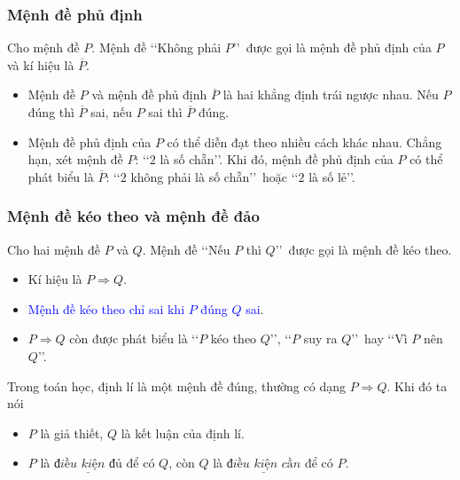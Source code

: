 \begin{tomtat}
\subsubsection{Mệnh đề phủ định}

\begin{boxdn}{}
	Cho mệnh đề $P$. Mệnh đề \lq\lq Không phải $P$\rq\rq\ được gọi là mệnh đề phủ định của $P$ và kí hiệu là $\overline{P}$.
	\begin{itemize}
		\item Mệnh đề $P$ và mệnh đề phủ định $\overline{P}$ là hai khẳng định trái ngược nhau. Nếu $P$ đúng thì $\overline{P}$ sai, nếu $P$ sai thì $\overline{P}$ đúng.
		\item Mệnh đề phủ định của $P$ có thể diễn đạt theo nhiều cách khác nhau. Chẳng hạn, xét mệnh đề $P$: \lq\lq $2$ là số chẵn\rq\rq. Khi đó, mệnh đề phủ định của $P$ có thể phát biểu là $\overline{P}$: \lq\lq $2$ không phải là số chẵn\rq\rq\ hoặc \lq\lq $2$ là số lẻ\rq\rq.
	\end{itemize} 
\end{boxdn}

\subsubsection{Mệnh đề kéo theo và mệnh đề đảo}

\begin{boxdn}{}
	Cho hai mệnh đề $P$ và $Q$. Mệnh đề \lq\lq Nếu $P$ thì $Q$\rq\rq\ được gọi là mệnh đề kéo theo.
	\begin{itemize}
		\item Kí hiệu là $P\Rightarrow Q.$
		\item \textcolor{blue}{Mệnh đề kéo theo chỉ sai khi $P$ đúng $Q$ sai}.
		\item $P\Rightarrow Q$ còn được phát biểu là \lq\lq $P$ kéo theo $Q$\rq\rq, \lq\lq $P$ suy ra $Q$\rq\rq\ hay \lq\lq Vì $P$ nên $Q$\rq\rq.
	\end{itemize}
\end{boxdn}

\begin{note}
	Trong toán học, định lí là một mệnh đề đúng, thường có dạng $P\Rightarrow Q$.
	Khi đó ta nói 
	\begin{itemize}
		\item $P$ là giả thiết, $Q$ là kết luận của định lí.
		\item $P$ là $\underline{\textit{điều kiện đủ}}$ để có $Q$, còn $Q$ là $\underline{\textit{điều kiện cần}}$ để có $P$.
	\end{itemize}
\end{note}


\end{tomtat}
